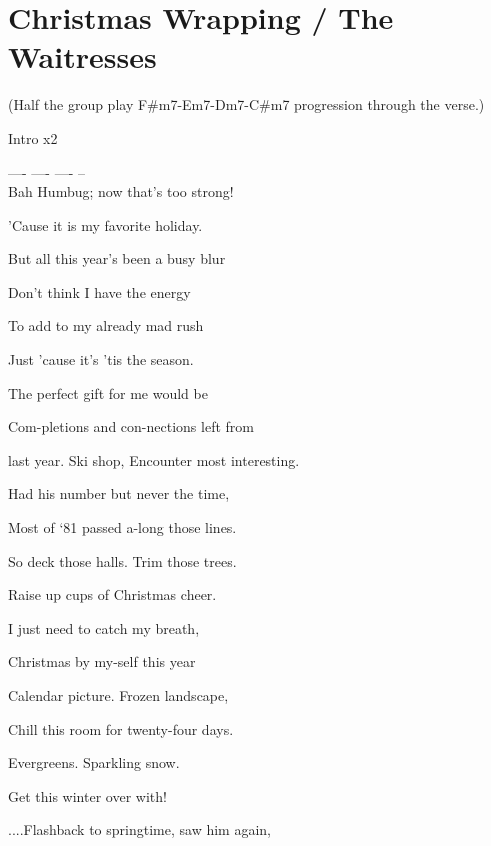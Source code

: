 \section{Christmas Wrapping / The Waitresses}\label{sec:christmas_wrapping}
{\small (Half the group play F\#m7-Em7-Dm7-C\#m7 progression through the verse.)}

\Amajor
\Bmajor
\CmajorFirst
\DmajorFirst
\Eminor
\Gmajor

\Afive
\Bfive
\CsharpFive

\FsharpMinorSevenNoFive
\EMinorSevenNoFive
\DMinorSevenNoFive
\CsharpMinorSevenNoFive


Intro x2 

 ----  ----  ----  -- \\

Bah Humbug; now that's too strong!

'Cause it is my favorite holiday.

But all this year's been a busy blur

Don't think I have the energy

To add to my already mad rush

Just 'cause it's 'tis the season.

The perfect gift for me would be

Com-pletions and con-nections left from 

last year. Ski shop, Encounter most interesting.

Had his number but never the time,

Most of `81 passed a-long those lines.

So deck those halls. Trim those trees.

Raise up cups of Christmas cheer.

I just need to catch my breath,

Christmas by my-self this year  

Calendar picture. Frozen landscape,

Chill this room for twenty-four days.

Evergreens. Sparkling snow.

Get this winter over with!

....Flashback to springtime, saw him again,

